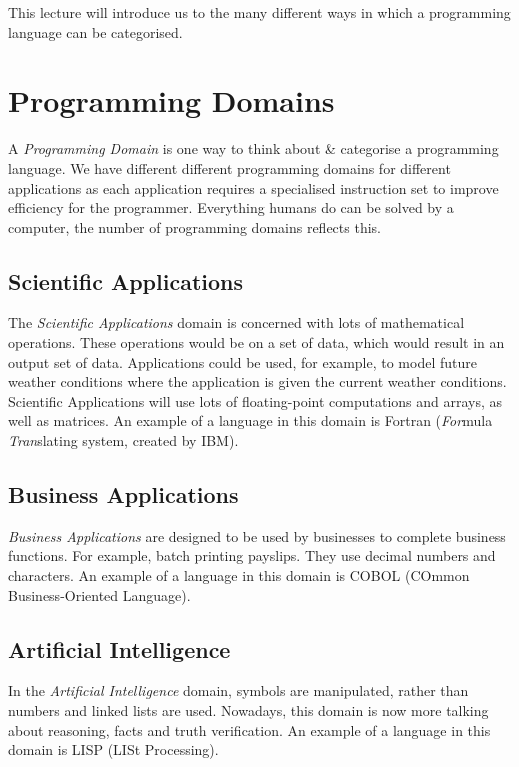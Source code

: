 
This lecture will introduce us to the many different ways in which a programming language can be categorised. 

\section{Programming Domains}
A \textit{Programming Domain} is one way to think about \& categorise a programming language. We have different different programming domains for different applications as each application requires a specialised instruction set to improve efficiency for the programmer. Everything humans do can be solved by a computer, the number of programming domains reflects this.
\subsection{Scientific Applications}
The \textit{Scientific Applications} domain is concerned with lots of mathematical operations. These operations would be on a set of data, which would result in an output set of data. Applications could be used, for example, to model future weather conditions where the application is given the current weather conditions. Scientific Applications will use lots of floating-point computations and arrays, as well as matrices. An example of a language in this domain is Fortran (\textit{For}mula \textit{Tran}slating system, created by IBM).

\subsection{Business Applications}
\textit{Business Applications} are designed to be used by businesses to complete business functions. For example, batch printing payslips. They use decimal numbers and characters. An example of a language in this domain is COBOL (COmmon Business-Oriented Language). 

\subsection{Artificial Intelligence}
In the \textit{Artificial Intelligence} domain, symbols are manipulated, rather than numbers and linked lists are used. Nowadays, this domain is now more talking about reasoning, facts and truth verification. An example of a language in this domain is LISP (LISt Processing).

